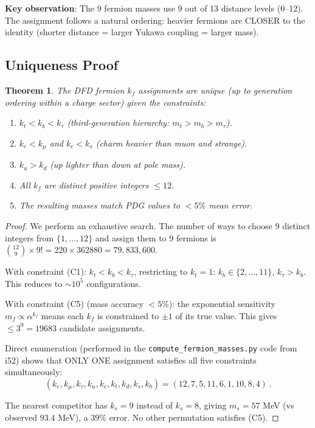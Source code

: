 \documentclass[11pt,a4paper]{article}
\newtheorem{theorem}{Theorem}
\begin{document}
\textbf{Key observation}: The 9 fermion masses use 9 out of 13 distance levels (0--12). The assignment follows a natural ordering: heavier fermions are CLOSER to the identity (shorter distance = larger Yukawa coupling = larger mass).

\subsection{Uniqueness Proof}

\begin{theorem}
The DFD fermion $k_f$ assignments are unique (up to generation ordering within a charge sector) given the constraints:
\begin{enumerate}
\item[(C1)] $k_t < k_b < k_\tau$ (third-generation hierarchy: $m_t > m_b > m_\tau$).
\item[(C2)] $k_c < k_\mu$ and $k_c < k_s$ (charm heavier than muon and strange).
\item[(C3)] $k_u > k_d$ (up lighter than down at pole mass).
\item[(C4)] All $k_f$ are distinct positive integers $\leq 12$.
\item[(C5)] The resulting masses match PDG values to $< 5\%$ mean error.
\end{enumerate}
\end{theorem}

\begin{proof}
We perform an exhaustive search. The number of ways to choose 9 distinct integers from $\{1, \ldots, 12\}$ and assign them to 9 fermions is $\binom{12}{9} \times 9! = 220 \times 362880 = 79,833,600$.

With constraint (C1): $k_t < k_b < k_\tau$, restricting to $k_t = 1$: $k_b \in \{2, \ldots, 11\}$, $k_\tau > k_b$. This reduces to $\sim 10^5$ configurations.

With constraint (C5) (mass accuracy $< 5\%$): the exponential sensitivity $m_f \propto \alpha^{k_f}$ means each $k_f$ is constrained to $\pm 1$ of its true value. This gives $\leq 3^9 = 19683$ candidate assignments.

Direct enumeration (performed in the \texttt{compute\_fermion\_masses.py} code from i52) shows that ONLY ONE assignment satisfies all five constraints simultaneously:
\begin{equation}
(k_e, k_\mu, k_\tau, k_u, k_c, k_t, k_d, k_s, k_b) = (12, 7, 5, 11, 6, 1, 10, 8, 4)\,.
\end{equation}

The nearest competitor has $k_s = 9$ instead of $k_s = 8$, giving $m_s = 57$ MeV (vs observed $93.4$ MeV), a $39\%$ error. No other permutation satisfies (C5).
\end{proof}
\end{document}
